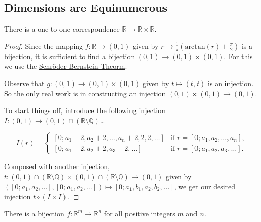 \subsection{Dimensions are Equinumerous}

\begin{theorem}
There is a one-to-one correspondence $\mathbb{R} \rightarrow \mathbb{R} \times \mathbb{R}$.
\end{theorem}

\begin{proof}
Since the mapping $f: \mathbb{R} \rightarrow (0,1)$ given by $ r \mapsto \frac{1}{\pi}(\textrm{arctan}(r) + \frac{\pi}{2})$ is a bijection, it is sufficient
to find a bijection $(0,1) \rightarrow (0,1) \times (0,1)$. For this we use the \hyperref[schroderbernsteinthm]{Schr\"oder-Bernstein Theorm}.

Observe that $g:(0,1) \rightarrow (0,1) \times (0,1)$ given by $t \mapsto (t,t)$ is an injection. So the only real work is in constructing an injection $(0,1) \times (0,1) \rightarrow (0,1)$.

To start things off, introduce the following injection $I :(0,1) \rightarrow (0,1)\cap(\mathbb{R} \setminus \mathbb{Q})$\dots

\[
I(r) = \begin{cases}
			[0;a_1+2,a_2+2,\dots,a_n+2,2,2,\dots] & \textrm{if } r=[0;a_1,a_2,\dots,a_n],\\
			[0;a_1+2,a_2+2,a_3+2,\dots] & \textrm{if } r=[0;a_1,a_2,a_3,\dots].
	   \end{cases}
\]

\noindent Composed with another injection, $t:(0,1)\cap(\mathbb{R} \setminus \mathbb{Q}) \times (0,1)\cap(\mathbb{R} \setminus \mathbb{Q}) \rightarrow (0,1)$ given by $([0;a_1,a_2,\dots],[0;a_1,a_2,\dots]) \mapsto [0;a_1,b_1,a_2,b_2,\dots]$, we get
our desired injection $t \circ (I \times I).$
\end{proof}

\begin{corollary}
There is a bijection $f : \mathbb{R}^m \rightarrow \mathbb{R}^n$ for all positive integers $m$ and $n$. 
\end{corollary}